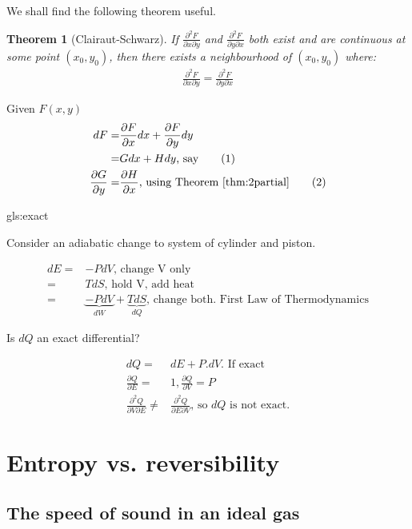 \documentclass[]{article}
\newcommand\numberthis{\addtocounter{equation}{1}\tag{\theequation}}
\newtheorem{thm}{Theorem}
\begin{document}
We shall find the following theorem useful.

\begin{thm}[Clairaut-Schwarz]\label{thm:2partial}
	If $\frac{\partial^2 F}{\partial x \partial y}$ and $\frac{\partial^2 F}{\partial y \partial x}$ both exist and are continuous at some point $(x_0,y_0)$, then there exists a neighbourhood of $(x_0,y_0)$ where:
	\begin{align*}
	\frac{\partial^2 F}{\partial x \partial y} = \frac{\partial^2 F}{\partial y \partial x}
	\end{align*}
\end{thm}


Given $F(x,y)$
\begin{align*}
dF =& \frac{\partial F}{\partial x}dx + \frac{\partial F}{\partial y}dy\\
=& G dx + H dy\text{, say}\numberthis \label{eq:dF}\\
\frac{\partial G}{\partial y} =& \frac{\partial H}{\partial x}\text{, using Theorem \ref{thm:2partial}}\numberthis \label{eq:exact}
\end{align*}

\glsdesc{gls:exact}

 
Consider an adiabatic change to system of cylinder and piston.

\begin{align*}
dE =& -P dV \text{, change V only}\\
=& T dS \text{, hold V, add heat}\\
=& \underbrace{-P dV}_{dW} + \underbrace{T dS}_{dQ}\text {, change both. First Law of Thermodynamics}
\end{align*}

Is $dQ$ an exact differential?

\begin{align*}
dQ =& dE + P.dV\text{. If exact}\\
\frac{\partial Q}{\partial E}=&1, \frac{\partial Q}{\partial V} = P\\
\frac{\partial^2 Q}{\partial V \partial E} \ne& \frac{\partial^2 Q}{\partial E \partial V}\text{, so $dQ$ is not exact.}
\end{align*}

\section{Entropy vs. reversibility}

\subsection{The speed of sound in an ideal gas}
\end{document}

